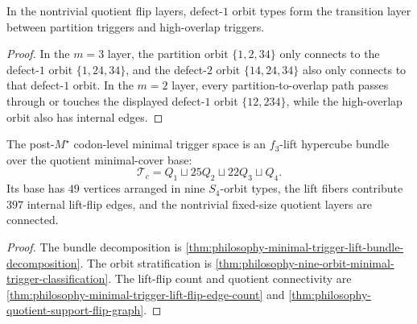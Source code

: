 \begin{corollary}
\label{cor:philosophy-defect-one-transition-layer}
In the nontrivial quotient flip layers, defect-$1$ orbit types form the
transition layer between partition triggers and high-overlap triggers.
\end{corollary}
\begin{proof}
In the $m=3$ layer, the partition orbit $\{1,2,34\}$ only connects to
the defect-$1$ orbit $\{1,24,34\}$, and the defect-$2$ orbit
$\{14,24,34\}$ also only connects to that defect-$1$ orbit. In the
$m=2$ layer, every partition-to-overlap path passes through or touches
the displayed defect-$1$ orbit $\{12,234\}$, while the high-overlap
orbit also has internal edges.
\end{proof}

\begin{theorem}
\label{thm:philosophy-minimal-trigger-bundle-theorem}
The post-$M^{\star}$ codon-level minimal trigger space is an
$f_{3}$-lift hypercube bundle over the quotient minimal-cover base:
$$
  \mathcal{T}_{c}
  =
  Q_{1}
  \sqcup
  25Q_{2}
  \sqcup
  22Q_{3}
  \sqcup
  Q_{4}.
$$
Its base has $49$ vertices arranged in nine $S_{4}$-orbit types, the
lift fibers contribute $397$ internal lift-flip edges, and the nontrivial
fixed-size quotient layers are connected.
\end{theorem}
\begin{proof}
The bundle decomposition is
\autoref{thm:philosophy-minimal-trigger-lift-bundle-decomposition}. The
orbit stratification is
\autoref{thm:philosophy-nine-orbit-minimal-trigger-classification}. The
lift-flip count and quotient connectivity are
\autoref{thm:philosophy-minimal-trigger-lift-flip-edge-count} and
\autoref{thm:philosophy-quotient-support-flip-graph}.
\end{proof}
